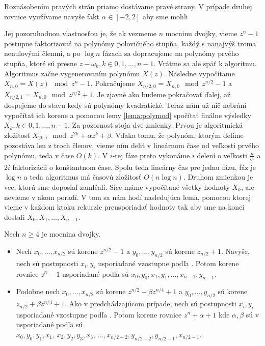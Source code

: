 \begin{dokaz}
    Roznásobením pravých strán priamo dostávame pravé strany. V
    prípade druhej rovnice využívame navyše fakt $\alpha \in [-2,2]$
    aby sme mohli
\end{dokaz}
Jej pozoruhodnou vlastnosťou je, že ak vezmeme $n$ mocninu dvojky,
vieme $z^n-1$ postupne faktorizovať na polynómy polovičného stupňa,
každý s nanajvýš troma nenulovými členmi, a po $\log n$ fázach sa
dopracujeme na polynómy prvého stupňa, ktoré sú presne $z-\omega_k, 
k\in0,1,\dots,n-1$. 
Vráťme sa ale späť k algoritmu. Algoritmus začne vygenerovaním
polynómu $X(z)$. Následne vypočítame $X_{n,0} =X(z) \mod z^n -1$.
Pokračujeme $X_{n/2,0} = X_{n,0} \mod z^{n/2}-1$ a 
$X_{n/2,1} = X_{n,0} \mod z^{n/2}+1$. Je zjavné ako budeme pokračovať
ďalej, až dospejeme do stavu kedy sú polynómy kvadratické. Teraz nám
už nič nebráni vypočítať ich korene a pomocou lemy \ref{lema:polymod}
spočítať finálne výsledky $X_k, k\in 0,1,\dots,n-1$. Za pozornosť
stoja dve zmienky. Prvou je algoritmická zložitosť
$X_{2k,i} \mod z^{2k} + \alpha z^k + \beta$. Vďaka tomu, že polynóm,
ktorým delíme pozostáva len z troch členov, vieme ním deliť v
lineárnom čase od veľkosti prvého polynómu, teda v čase $O(k)$. V
$i$-tej fáze preto vykonáme $i$ delení o veľkosti $\frac{n}{2^i}$ a
$2i$ faktorizácii o konštantnom čase. Spolu teda lineárny čas pre
jednu fázu, fáz je $\log n$ a teda algoritmus má časovú
zložitosť $O(n \log n)$.
Druhom zmienkou je vec, ktorú sme doposiaľ zamlčali. Síce máme
vypočítané všetky hodnoty $X_k$, ale nevieme v akom poradí.
V tom sa nám hodí nasledujúca lema, pomocou ktorej vieme v každom
ktoku rekurzie preusporiadať hodnoty tak aby sme na konci dostali
$X_0,X_1,\dots,X_{n-1}$.
\begin{lema}
Nech $n\ge4$ je mocnina dvojky.
\begin{itemize}
\item
    Nech $x_0,\dots,x_{n/2}$ sú korene $z^{n/2} -1$ a
    $y_0,\dots,y_{n/2}$ sú korene $z_{n/2}+1$. Navyše, nech sú
    postupnosti $x_i, y_i$ usporiadané vzostupne podľa .
    Potom korene rovnice $z^n -1$ usporiadané podľa  sú
    $x_0,y_0,x_1,y_1,\dots,x_{n-1},y_{n-1}$.
\item
    Podobne nech
    $x_0,\dots,x_{n/2}$ sú korene $z^{n/2} -\beta z^{n/4} +1$ a
    $y_0,\dots,y_{n/2}$ sú korene $z_{n/2} +\beta z^{n/4} +1$. Ako v
    predchádzajúcom prípade, nech sú
    postupnosti $x_i, y_i$ usporiadané vzostupne podľa .
    Potom korene rovnice $z^n +\alpha +1$ kde $\alpha,\beta$ sú v
     usporiadané podľa  sú
    $x_0,y_0,y_1,x_1, \, x_2,y_2,y_3,x_3, \, \dots,
     x_{n/2-2},y_{n/2-2},y_{n/2-1},x_{n/2-1}$.

\end{itemize}
\end{lema}
